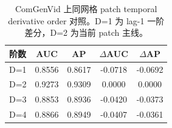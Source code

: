 \begin{table}[!t]
  \centering
  \caption{ComGenVid 上同网格 patch temporal derivative order 对照。D=1 为 lag-1 一阶差分，D=2 为当前 patch 主线。}
  \label{tab:temporal_order}
  \begin{tabular}{lcccc}
    \toprule
    阶数 & AUC & AP & $\Delta$AUC & $\Delta$AP \\
    \midrule
    D=1 & 0.8556 & 0.8617 & -0.0718 & -0.0692 \\
    D=2 & 0.9273 & 0.9309 & 0.0000 & 0.0000 \\
    D=3 & 0.8853 & 0.8936 & -0.0420 & -0.0373 \\
    D=4 & 0.8866 & 0.8949 & -0.0407 & -0.0361 \\
    \bottomrule
  \end{tabular}
\end{table}
